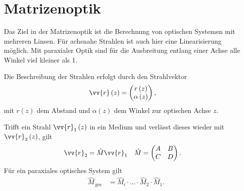 \documentclass[a4paper,12pt]{article}
\numberwithin{equation}{section}
\begin{document}
\newpage
\section{Matrizenoptik}
Das Ziel in der Matrizenoptik ist die Berechnung von optischen Systemen mit mehreren Linsen.
Für achsnahe Strahlen ist auch hier eine Linearisierung möglich. 
Mit paraxialer Optik sind für die Ausbreitung entlang einer Achse alle Winkel viel kleiner als 1.\par
Die Beschreibung der Strahlen erfolgt durch den Strahlvektor
\begin{align} 
        \vv{r}\left(z\right)&=\begin{pmatrix}
                r\left(z\right)\\\alpha \left(z\right)
        \end{pmatrix}
,\end{align} 
mit $r\left(z\right)$ dem Abstand und $\alpha \left(z\right)$ dem Winkel zur optischen Achse $z$.\par
Trifft ein Strahl $\vv{r}_1\left(z\right)$ in ein Medium und verlässt dieses wieder mit $\vv{r}_2\left(z\right)$, gilt 
\begin{align} 
        \vv{r}_2&=\hat{M}\vv{r}_1&\hat{M}&=\begin{pmatrix}
                A&B\\C&D
        \end{pmatrix}
.\end{align} 
Für ein paraxiales optisches System gilt
\begin{align} 
        \hat{M}_{\,\text{ges}\,}&=\hat{M}_i\cdot \hdots \cdot \hat{M}_2\cdot \hat{M}_1
.\end{align} 
\end{document}
